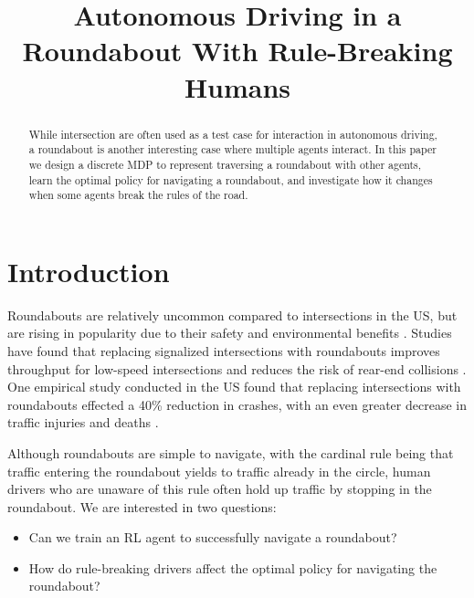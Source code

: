 \documentclass[conference]{IEEEtran}
\begin{document}
\title{Autonomous Driving in a Roundabout With Rule-Breaking Humans}

\author{
}

\maketitle

\begin{abstract}
While intersection are often used as a test case for interaction in autonomous driving, a roundabout is another interesting case where multiple agents interact. In this paper we design a discrete MDP to represent traversing a roundabout with other agents, learn the optimal policy for navigating a roundabout, and investigate how it changes when some agents break the rules of the road.
\end{abstract}


\section{Introduction}
Roundabouts are relatively uncommon compared to intersections in the US,
but are rising in popularity due to their safety and environmental benefits \cite{MANDAVILLI2008135}. Studies have found that replacing signalized intersections with roundabouts improves throughput for low-speed intersections \cite{persaud2001safety} and reduces the risk of rear-end collisions \cite{saccomanno2008comparing}. One empirical study conducted in the US found that replacing intersections with roundabouts effected a 40\% reduction in crashes, with an even greater decrease in traffic injuries and deaths \cite{persaud2001safety}.

Although roundabouts are simple to navigate, with the cardinal rule being that traffic entering the roundabout yields to traffic already in the circle, human drivers who are unaware of this rule often hold up traffic by stopping in the roundabout. We are interested in two questions:
\begin{itemize}
	\item Can we train an RL agent to successfully navigate a roundabout?
	\item How do rule-breaking drivers affect the optimal policy for navigating the roundabout?
\end{itemize}
\end{document}
